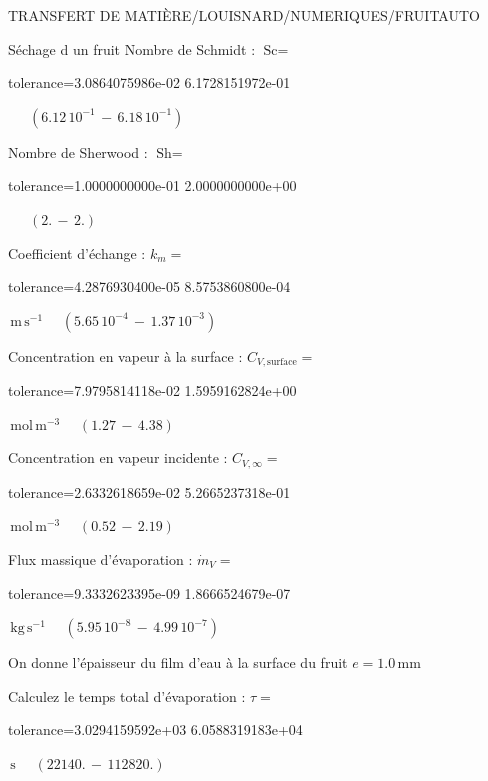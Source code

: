 \documentclass[12pt]{article}
\begin{document}
\begin{quiz}{TRANSFERT DE MATIÈRE/LOUISNARD/NUMERIQUES/FRUITAUTO}
\begin{cloze}{Séchage d un fruit}
Nombre de Schmidt : $\text{Sc} =  $
\begin{numerical}[points=1] 
\item[tolerance={3.0864075986e-02}] 6.1728151972e-01 
\end{numerical} 
 $\,$ 
 $ \quad ( 6.12 \, 10^{-1}  \, - \,  6.18 \, 10^{-1} ) $ 

Nombre de Sherwood : $\text{Sh} =  $
\begin{numerical}[points=2] 
\item[tolerance={1.0000000000e-01}] 2.0000000000e+00 
\end{numerical} 
 $\,$ 
 $ \quad (2. \, - \, 2.) $ 

Coefficient d'échange : $k_m =  $
\begin{numerical}[points=1] 
\item[tolerance={4.2876930400e-05}] 8.5753860800e-04 
\end{numerical} 
 $\,  \mathrm{m}\,  \mathrm{s}^{-1}$ 
 $ \quad ( 5.65 \, 10^{-4}  \, - \,  1.37 \, 10^{-3} ) $ 

Concentration en vapeur à la surface : $C_{V, \text{surface}} =  $
\begin{numerical}[points=2] 
\item[tolerance={7.9795814118e-02}] 1.5959162824e+00 
\end{numerical} 
 $\,  \mathrm{mol}\,  \mathrm{m}^{-3}$ 
 $ \quad (1.27 \, - \, 4.38) $ 

Concentration en vapeur incidente : $C_{V, \infty} =  $
\begin{numerical}[points=2] 
\item[tolerance={2.6332618659e-02}] 5.2665237318e-01 
\end{numerical} 
 $\,  \mathrm{mol}\,  \mathrm{m}^{-3}$ 
 $ \quad (0.52 \, - \, 2.19) $ 

Flux massique d'évaporation : $\dot{m}_V =  $
\begin{numerical}[points=1] 
\item[tolerance={9.3332623395e-09}] 1.8666524679e-07 
\end{numerical} 
 $\,  \mathrm{kg}\,  \mathrm{s}^{-1}$ 
 $ \quad ( 5.95 \, 10^{-8}  \, - \,  4.99 \, 10^{-7} ) $ 

 

On donne l'épaisseur du film d'eau à la surface du fruit $e = 1.0\,  \mathrm{mm} $

Calculez le temps total d'évaporation : $\tau =  $
\begin{numerical}[points=2] 
\item[tolerance={3.0294159592e+03}] 6.0588319183e+04 
\end{numerical} 
 $\,  \mathrm{s}$ 
 $ \quad (22140. \, - \, 112820.) $ 


\end{cloze}
\end{quiz}
\end{document}
